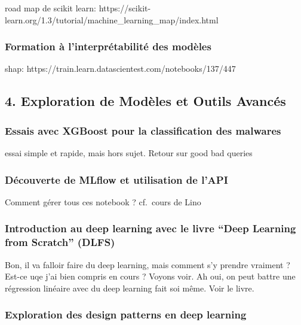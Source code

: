 \documentclass[
  letterpaper,
  DIV=11,
  numbers=noendperiod]{scrartcl}
\begin{document}
road map de scikit learn:
https://scikit-learn.org/1.3/tutorial/machine\_learning\_map/index.html

\subsubsection{Formation à l'interprétabilité des
modèles}\label{formation-uxe0-linterpruxe9tabilituxe9-des-moduxe8les}

shap: https://train.learn.datascientest.com/notebooks/137/447

\subsection{4. Exploration de Modèles et Outils
Avancés}\label{exploration-de-moduxe8les-et-outils-avancuxe9s}

\subsubsection{Essais avec XGBoost pour la classification des
malwares}\label{essais-avec-xgboost-pour-la-classification-des-malwares}

essai simple et rapide, mais hors sujet. Retour sur good bad queries

\subsubsection{Découverte de MLflow et utilisation de
l'API}\label{duxe9couverte-de-mlflow-et-utilisation-de-lapi}

Comment gérer tous ces notebook ? cf.~cours de Lino

\subsubsection{Introduction au deep learning avec le livre ``Deep
Learning from Scratch''
(DLFS)}\label{introduction-au-deep-learning-avec-le-livre-deep-learning-from-scratch-dlfs}

Bon, il va falloir faire du deep learning, mais comment s'y prendre
vraiment ? Est-ce uqe j'ai bien compris en cours ? Voyons voir. Ah oui,
on peut battre une régression linéaire avec du deep learning fait soi
même. Voir le livre.

\subsubsection{Exploration des design patterns en deep
learning}\label{exploration-des-design-patterns-en-deep-learning}
\end{document}
